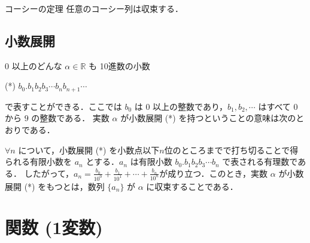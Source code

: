 \documentclass[a4paper]{ltjsarticle}
\newcommand{\seq}[1]{\{#1\}}
\newcommand{\R}{\mathbb{R}}
\begin{document}
\begin{theorem}{コーシーの定理}{}
任意のコーシー列は収束する．
\end{theorem}

\subsection{小数展開}
0 以上のどんな $\alpha \in \R$ も 10進数の小数 

\begin{tcb}{}{}
(*)    $b_0.b_1 b_2 b_3 \cdots b_n b_{n+1}\cdots$
\end{tcb}

で表すことができる．ここでは $b_0$ は $0$ 以上の整数であり，$b_1, b_2, \cdots$ はすべて $0$ から $9$ の整数である．
実数 $\alpha$ が小数展開 (*) を持つということの意味は次のとおりである．

\begin{tcb}{}{}
$\forall n$ について，小数展開 (*) を小数点以下$n$位のところまでで打ち切ることで得られる有限小数を $a_n$ とする．$a_n$ は有限小数 $b_0.b_1 b_2 b_3 \cdots b_n$ で表される有理数である．
したがって，$a_n = \frac{b_0}{10^0} + \frac{b_1}{10^1} + \cdots + \frac{b_n}{10^n}$が成り立つ．このとき，実数 $\alpha$ が小数展開 (*) をもつとは，数列 $\seq{a_n}$ が $\alpha$ に収束することである．

\end{tcb}

\section{関数 (1変数)}
\end{document}
